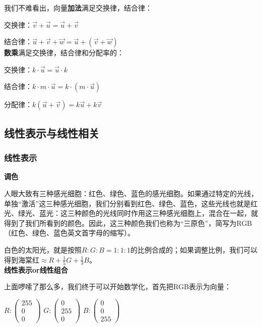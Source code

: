 \documentclass[UTF8]{ctexbook}
\begin{document}
我们不难看出，向量\textbf{加法}满足交换律，结合律：

交换律：$\vec{v}+\vec{u}=\vec{u}+\vec{v}$

结合律：$\vec{u}+\vec{v}+\vec{w}=\vec{u}+(\vec{v}+\vec{w})$\\


\textbf{数乘}满足交换律，结合律和分配率的：

交换律：$k \cdot \vec{u} = \vec{u} \cdot k$

结合律：$k \cdot m \cdot \vec{u} = k \cdot (m \cdot \vec{u})$

分配律：$k(\vec{u}+\vec{v})=k\vec{u}+k\vec{v}$

\subsection{线性表示与线性相关}

\subsubsection{线性表示}

\textbf{调色}

人眼大致有三种感光细胞：红色、绿色、蓝色的感光细胞。如果通过特定的光线，单独“激活”这三种感光细胞，我们分别看到红色、绿色、蓝色，这些光线也就是红光、绿光、蓝光：这三种颜色的光线同时作用这三种感光细胞上，混合在一起，就得到了我们所看到的颜色。因此，这三种颜色我们也称为“三原色”，简写为RGB（红色、绿色、蓝色英文首字母的缩写）。

白色的太阳光，就是按照$R:G:B=1:1:1$的比例合成的；如果调整比例，我们可以得到海棠红$\approx R + \frac{1}{5}G+\frac{1}{3}B$。\\



\textbf{线性表示or线性组合}

上面啰嗦了那么多，我们终于可以开始数学化，首先把RGB表示为向量：

$R:\begin{pmatrix} 255\\ 0 \\ 0 \end{pmatrix}$ \qquad
$G:\begin{pmatrix} 0\\ 255 \\ 0 \end{pmatrix}$ \qquad
$B:\begin{pmatrix} 0\\ 0 \\ 255 \end{pmatrix}$ \qquad\\
\end{document}
